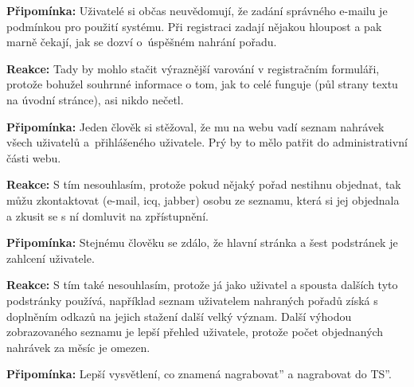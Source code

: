\bigskip

\textbf{Připomínka:} Uživatelé si občas neuvědomují, že zadání správného e-mailu je podmínkou pro použití systému. Při registraci zadají nějakou hloupost a pak marně čekají, jak se dozví o~úspěšném nahrání pořadu.

\textbf{Reakce:} Tady by mohlo stačit výraznější varování v registračním formuláři, protože bohužel souhrnné informace o tom, jak to celé funguje (půl strany textu na úvodní stránce), asi nikdo nečetl.

\bigskip

\textbf{Připomínka:} Jeden člověk si stěžoval, že mu na webu vadí seznam nahrávek všech uživatelů a~přihlášeného uživatele. Prý by to mělo patřit do administrativní části webu.

\textbf{Reakce:} S tím nesouhlasím, protože pokud nějaký pořad nestihnu objednat, tak můžu zkontaktovat (e-mail, icq, jabber) osobu ze seznamu, která si jej objednala a zkusit se s ní domluvit na zpřístupnění.

\bigskip

\textbf{Připomínka:} Stejnému člověku se zdálo, že hlavní stránka a šest podstránek je zahlcení uživatele. 

\textbf{Reakce:} S tím také nesouhlasím, protože já jako uživatel a spousta dalších tyto podstránky používá, například seznam uživatelem nahraných pořadů získá s doplněním odkazů na jejich stažení další velký význam. Další výhodou zobrazovaného seznamu je lepší přehled uživatele, protože počet objednaných nahrávek za měsíc je omezen.

\bigskip

\textbf{Připomínka:} Lepší vysvětlení, co znamená \quotedblbase nagrabovat'' a \quotedblbase nagrabovat do TS''. 


